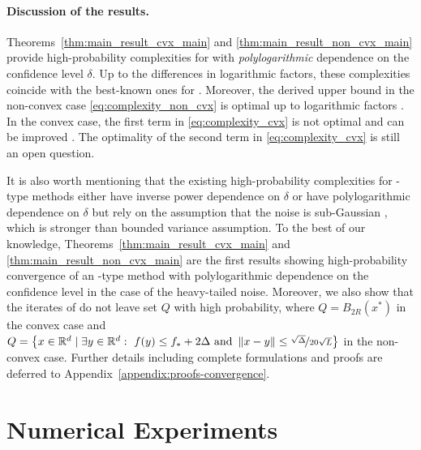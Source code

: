 \documentclass{article}
\begin{document}
\paragraph{Discussion of the results.} Theorems~\ref{thm:main_result_cvx_main} and \ref{thm:main_result_non_cvx_main} provide high-probability complexities for  with \emph{polylogarithmic} dependence on the confidence level $\delta$. Up to the differences in logarithmic factors, these complexities coincide with the best-known ones for  \citep{sadiev2023high, nguyen2023improved}. Moreover, the derived upper bound in the non-convex case \eqref{eq:complexity_non_cvx} is optimal up to logarithmic factors \citep{arjevani2023lower, zhang2020adaptive}. In the convex case, the first term in \eqref{eq:complexity_cvx} is not optimal \citep{nemirovskij1983problem} and can be improved \citep{gorbunov2020stochastic, sadiev2023high}. The optimality of the second term in \eqref{eq:complexity_cvx} is still an open question.


It is also worth mentioning that the existing high-probability complexities for -type methods either have inverse power dependence on $\delta$ \citep{wang2023convergence} or have polylogarithmic dependence on $\delta$ but rely on the assumption that the noise is sub-Gaussian \citep{li2020high, liu2023high}, which is stronger than bounded variance assumption. To the best of our knowledge, Theorems~\ref{thm:main_result_cvx_main} and \ref{thm:main_result_non_cvx_main} are the first results showing high-probability convergence of an -type method with polylogarithmic dependence on the confidence level in the case of the heavy-tailed noise. Moreover, we also show that the iterates of  do not leave set $Q$ with high probability, where $Q = B_{2R}(x^*)$ in the convex case and $Q = \left\{x \in {\mathbb R}^d \mid \exists y \in {\mathbb R}^d: \ f(y) \leq f_* + 2\Delta \text{ and } \left\lVert x - y\right\rVert \leq \nicefrac{\sqrt{\Delta}}{20\sqrt{L}}\right\}$ in the non-convex case. Further details including complete formulations and proofs are deferred to Appendix~\ref{appendix:proofs-convergence}.



\section{Numerical Experiments}\label{section:experiments}
\end{document}
